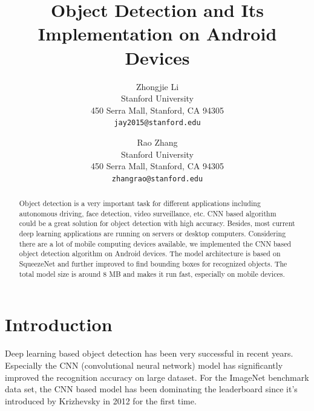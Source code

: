 \documentclass[10pt,twocolumn,letterpaper]{article}
\begin{document}
\title{Object Detection and Its Implementation on Android Devices}

\author{Zhongjie Li\\
Stanford University\\
450 Serra Mall, Stanford, CA 94305\\
{\tt\small jay2015@stanford.edu}
\and
Rao Zhang\\
Stanford University\\
450 Serra Mall, Stanford, CA 94305\\
{\tt\small zhangrao@stanford.edu}
}

\maketitle

\begin{abstract}
Object detection is a very important task for different applications including autonomous driving, face detection, video surveillance, etc. CNN based algorithm could be a great solution for object detection with high accuracy. Besides, most current deep learning applications are running on servers or desktop computers. Considering there are a lot of mobile computing devices available, we implemented the CNN based object detection algorithm on Android devices. The model architecture is based on SqueezeNet and further improved to find bounding boxes for recognized objects. The total model size is around 8 MB and makes it run fast, especially on mobile devices.

\end{abstract}

\section{Introduction}
Deep learning based object detection has been very successful in recent years. Especially the CNN (convolutional neural network) model has significantly improved the recognition accuracy on large dataset. For the ImageNet benchmark data set, the CNN based model has been dominating the leaderboard since it's introduced by Krizhevsky in 2012 for the first time. 
\end{document}
